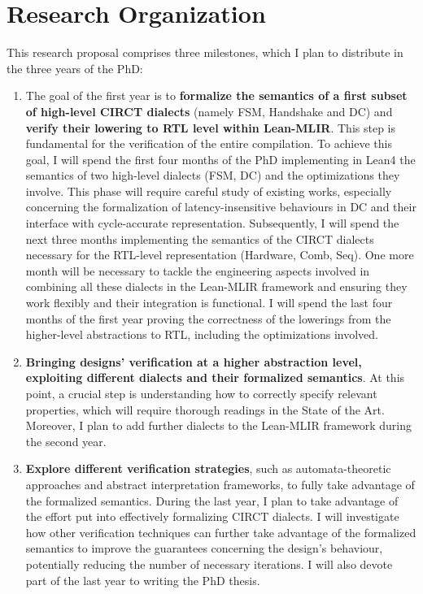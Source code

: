 \documentclass[acmtog]{acmart}
\begin{document}
\section{Research Organization}

This research proposal comprises three milestones, which I plan to distribute in the three years of the PhD: 
\begin{enumerate}
    \item The goal of the first year is to \textbf{formalize the semantics of a first subset of high-level CIRCT dialects} (namely FSM, Handshake and DC) 
 and \textbf{verify their lowering to RTL level within Lean-MLIR}. This step is fundamental for the verification of the entire compilation. 
 To achieve this goal, I will spend the first four months of the PhD implementing in Lean4 the semantics of two high-level dialects (FSM, DC) and 
 the optimizations they involve. This phase will require careful study of existing works, especially concerning the formalization of latency-insensitive 
 behaviours in DC and their interface with cycle-accurate representation. 
 Subsequently, I will spend the next three months implementing the semantics of the CIRCT dialects necessary for the RTL-level representation (Hardware, Comb, Seq). 
 One more month will be necessary to tackle the engineering aspects involved in combining all these dialects in the Lean-MLIR framework and ensuring they work 
 flexibly and their integration is functional. I will spend the last four months of the first year proving the correctness of the lowerings from the higher-level 
 abstractions to RTL, including the optimizations involved. 
    \item \textbf{Bringing designs’ verification at a higher abstraction level, exploiting different dialects and their formalized semantics}. 
 At this point, a crucial step is understanding how to correctly specify relevant properties, which will require thorough readings in the State of the Art. 
 Moreover, I plan to add further dialects to the Lean-MLIR framework during the second year. 
    \item \textbf{Explore different verification strategies}, such as automata-theoretic approaches and abstract interpretation frameworks, 
 to fully take advantage of the formalized semantics. During the last year, I plan to take advantage of the effort put into effectively formalizing CIRCT dialects. I will investigate how other verification techniques can further take advantage of the formalized semantics to improve the 
 guarantees concerning the design’s behaviour, potentially reducing the number of necessary iterations. 
 I will also devote part of the last year to writing the PhD thesis. 
\end{enumerate}

\thispagestyle{empty}


\thispagestyle{empty}
\end{document}
